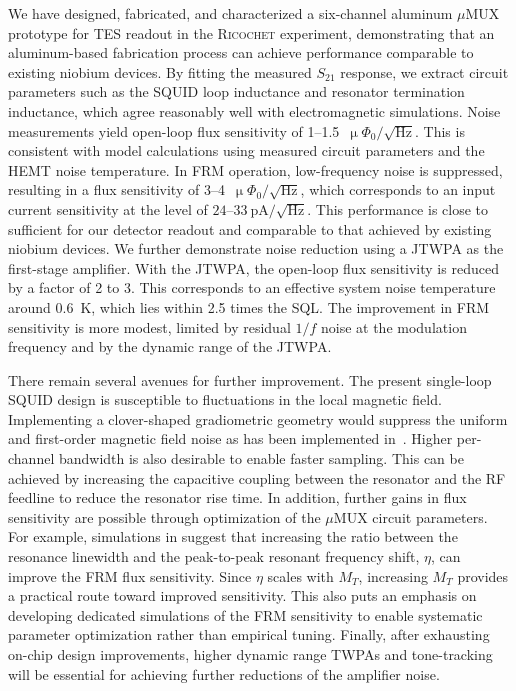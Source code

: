 \documentclass[10pt]{iopart}
\newcommand{\ricochet}{\textsc{Ricochet}\xspace}
\newcommand{\uMUX}{$\mu$MUX\xspace}
\newcommand{\uPhirtHz}{$\upmu \Phi_0/\sqrt{\text{Hz}}$\xspace}
\begin{document}
We have designed, fabricated, and characterized a six-channel aluminum \uMUX prototype for TES readout in the \ricochet experiment, demonstrating that an aluminum-based fabrication process can achieve performance comparable to existing niobium devices. By fitting the measured $S_{21}$ response, we extract circuit parameters such as the SQUID loop inductance and resonator termination inductance, which agree reasonably well with electromagnetic simulations. Noise measurements yield open-loop flux sensitivity of 1--1.5~\uPhirtHz. This is consistent with model calculations using measured circuit parameters and the HEMT noise temperature. In FRM operation, low-frequency noise is suppressed, resulting in a flux sensitivity of 3--4~\uPhirtHz, which corresponds to an input current sensitivity at the level of $24$--$33~\mathrm{pA}/\sqrt{\mathrm{Hz}}$. This performance is close to sufficient for our detector readout and comparable to that achieved by existing niobium devices. We further demonstrate noise reduction using a JTWPA as the first-stage amplifier. With the JTWPA, the open-loop flux sensitivity is reduced by a factor of 2 to 3. This corresponds to an effective system noise temperature around \qty{0.6}{\K}, which lies within 2.5 times the SQL. The improvement in FRM sensitivity is more modest, limited by residual $1/f$ noise at the modulation frequency and by the dynamic range of the JTWPA.

There remain several avenues for further improvement. The present single-loop SQUID design is susceptible to fluctuations in the local magnetic field. Implementing a clover-shaped gradiometric geometry would suppress the uniform and first-order magnetic field noise as has been implemented in~\cite{kempf_design_2017, mates_microwave_2011}. Higher per-channel bandwidth is also desirable to enable faster sampling. This can be achieved by increasing the capacitive coupling between the resonator and the RF feedline to reduce the resonator rise time. In addition, further gains in flux sensitivity are possible through optimization of the \uMUX circuit parameters. For example, simulations in \cite{schuster_simulation_2023} suggest that increasing the ratio between the resonance linewidth and the peak-to-peak resonant frequency shift, $\eta$, can improve the FRM flux sensitivity. Since $\eta$ scales with $M_T$, increasing $M_T$ provides a practical route toward improved sensitivity. This also puts an emphasis on developing dedicated simulations of the FRM sensitivity to enable systematic parameter optimization rather than empirical tuning. Finally, after exhausting on-chip design improvements, higher dynamic range TWPAs and tone-tracking will be essential for achieving further reductions of the amplifier noise.
\end{document}
